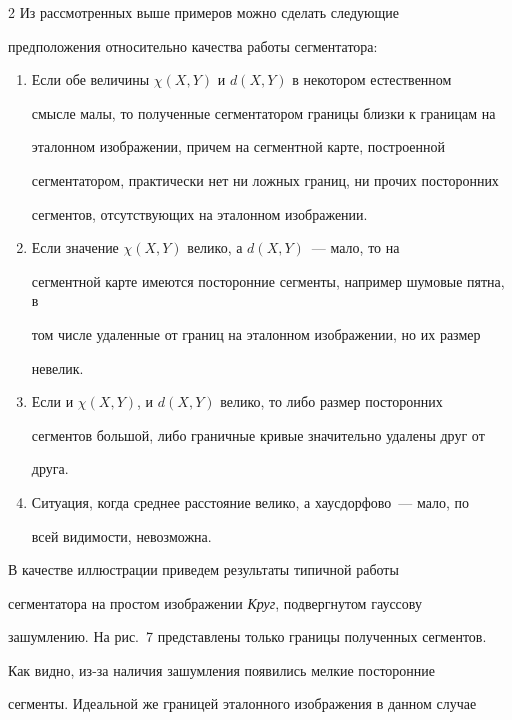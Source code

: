 \begin{multicols}{2}
  Из рассмотренных выше примеров можно сделать следующие 


предположения относительно качества работы сегментатора:


  \begin{enumerate}[1.]


  \item  Если обе величины $\chi(X, Y)$ и $d(X, Y)$ в некотором естественном 


смысле малы, то полученные сегментатором границы близки к границам на 


эталонном изображении, причем на сегментной карте, построенной 


сегментатором, практически нет ни ложных границ, ни прочих посторонних 


сегментов, отсутствующих на эталонном изображении.


  \item Если значение $\chi(X, Y)$ велико, а $d(X, Y)$~--- мало, то на 


сегментной карте имеются посторонние сегменты, например шумовые пятна, в 


том числе удаленные от границ на эталонном изображении, но их размер 


невелик.


  \item  Если и $\chi(X, Y)$, и $d(X, Y)$ велико, то либо размер посторонних 


сегментов большой, либо граничные кривые значительно удалены друг от 


друга.


  \item Ситуация, когда среднее расстояние велико, а хаусдорфово~--- мало, по 


всей видимости, невозможна.


  \end{enumerate}


  


  В качестве иллюстрации приведем результаты типичной работы 


сегментатора на простом изображении \textit{Круг}, подвергнутом гауссову 


зашумлению. На рис.~7 представлены только границы полученных сегментов. 


Как видно, из-за наличия зашумления появились мелкие посторонние 


сегменты. Идеальной же границей эталонного изображения в данном случае 



\end{multicols}
